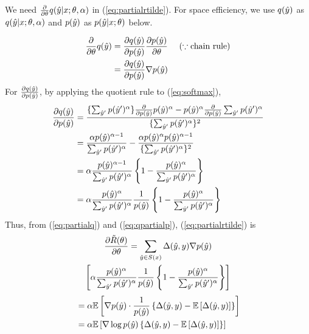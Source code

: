 We need $\frac {\partial}{\partial \theta} q(\hat{y}|x;\theta,\alpha)$ in (\ref{eq:partialrtilde}).
For space efficiency, we use $q(\hat{y})$ as $q(\hat{y}|x;\theta,\alpha)$ and $p(\hat{y})$ as $p(\hat{y}| x;\theta)$ below.

\begin{align}
\label{eq:partialq}
\frac {\partial}{\partial \theta} q(\hat{y}) &= \frac{\partial q(\hat{y})}{\partial p(\hat{y})} \frac{\partial p(\hat{y})}{\partial \theta} \ \ \ \ (\because \text{chain rule}) \nonumber \\
    &= \frac{\partial q(\hat{y})}{\partial p(\hat{y})} \nabla p(\hat{y})
\end{align}
For $\frac{\partial q(\hat{y})}{\partial p(\hat{y})}$, by applying the quotient rule to (\ref{eq:softmax}),
\begin{align}
\label{eq:qpartialp}
\frac{\partial q(\hat{y})}{\partial p(\hat{y})} &= \frac{\{\sum_{\hat{y}'} p(\hat{y}')^\alpha\} \frac {\partial}{\partial p(\hat{y})} p(\hat{y})^\alpha - p(\hat{y})^\alpha \frac {\partial}{\partial p(\hat{y})} \sum_{\hat{y}'} p(\hat{y}')^\alpha} {\{\sum_{\hat{y}'} p(\hat{y}')^\alpha\}{^2} } \nonumber \\
  &= \frac{\alpha p(\hat{y}) ^{\alpha-1}} {\sum_{\hat{y}'} p(\hat{y}')^\alpha} - \frac{\alpha p(\hat{y}) ^\alpha p(\hat{y})^{\alpha-1}} {\{\sum_{\hat{y}'} p(\hat{y}')^\alpha\}{^2}} \nonumber \\
  &= \alpha \frac{p(\hat{y}) ^{\alpha-1}}{\sum_{\hat{y}'} p(\hat{y}')^\alpha} \left\{1- \frac{p(\hat{y})^\alpha}{\sum_{\hat{y}'} p(\hat{y}')^\alpha} \right\} \nonumber \\
  &= \alpha \frac{p(\hat{y}) ^{\alpha}}{\sum_{\hat{y}'} p(\hat{y}')^\alpha} \frac{1}{p(\hat{y})} \left\{1- \frac{p(\hat{y})^\alpha}{\sum_{\hat{y}'} p(\hat{y}')^\alpha} \right\}
\end{align}
Thus, from (\ref{eq:partialq}) and (\ref{eq:qpartialp}), (\ref{eq:partialrtilde}) is
\begin{multline}
\frac {\partial \tilde{R}(\theta)}{\partial \theta} = \sum_{\hat{y} \in S(x)} \Delta(\hat{y},y) \nabla p(\hat{y}) \\ \left[ \alpha \frac{p(\hat{y}) ^{\alpha}}{\sum_{\hat{y}'} p(\hat{y}')^\alpha} \frac{1}{p(\hat{y})} \left\{1- \frac{p(\hat{y})^\alpha}{\sum_{\hat{y}'} p(\hat{y}')^\alpha} \right\}  \right] \nonumber
\end{multline}
\begin{align}
\label{eq:partialr2}
  &= \alpha \mathbb{E} \left[\nabla\mrtpsimple \cdot \frac{1}{\mrtpsimple} \left\{ \mrtdelta - \mathbb{E}\left[\mrtdelta \right] \right\}  \right] \nonumber \\
  &= \alpha \mathbb{E} \left[\nabla \log \mrtpsimple \left\{ \mrtdelta - \mathbb{E}\left[\mrtdelta \right] \right\}  \right] %
\end{align}

